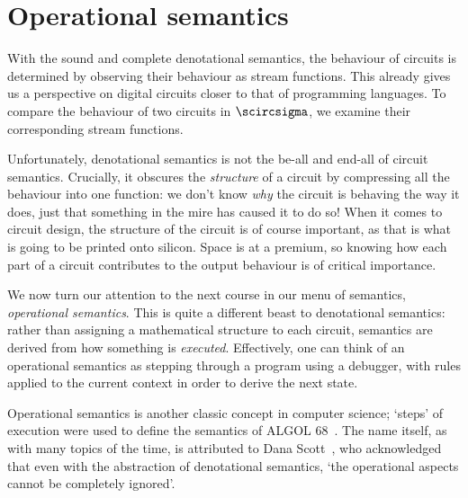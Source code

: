 \chapter{Operational semantics}

With the sound and complete denotational semantics, the behaviour of circuits is
determined by observing their behaviour as stream functions.
This already gives us a perspective on digital circuits closer to that of
programming languages.
To compare the behaviour of two circuits in \(\scircsigma\), we examine their
corresponding stream functions.

Unfortunately, denotational semantics is not the be-all and end-all of circuit
semantics.
Crucially, it obscures the \emph{structure} of a circuit by compressing all the
behaviour into one function: we don't know \emph{why} the circuit is behaving
the way it does, just that something in the mire has caused it to do so!
When it comes to circuit design, the structure of the circuit is of course
important, as that is what is going to be printed onto silicon.
Space is at a premium, so knowing how each part of a circuit contributes to the
output behaviour is of critical importance.

We now turn our attention to the next course in our menu of semantics,
\emph{operational semantics}.
This is quite a different beast to denotational semantics: rather than assigning
a mathematical structure to each circuit, semantics are derived from how
something is \emph{executed}.
Effectively, one can think of an operational semantics as stepping through a
program using a debugger, with rules applied to the current context in order to
derive the next state.

Operational semantics is another classic concept in computer science; `steps' of
execution were used to define the semantics of ALGOL
68~\cite{vanwijngaarden1976revised}.
The name itself, as with many topics of the time, is attributed to Dana
Scott~\cite{scott1970outline}, who acknowledged that even with the abstraction
of denotational semantics, `the operational aspects cannot be completely
ignored'.

